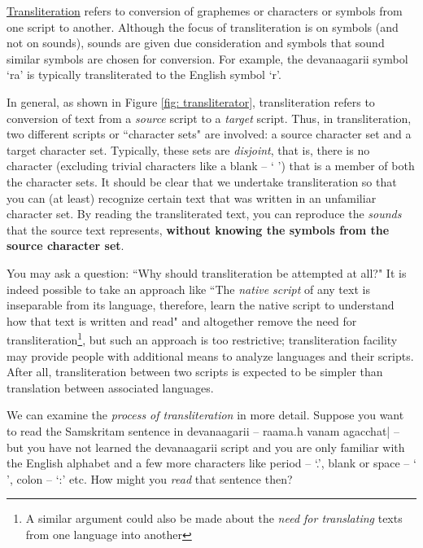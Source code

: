 \documentclass[a4paper, 12pt]{article}
\newcommand \sans[1]{
    \textsanskrit{#1}
}
\begin{document}
\href{https://en.m.wikipedia.org/wiki/Transliteration}{Transliteration} refers to conversion of graphemes or characters or symbols from one script to another. Although the focus of transliteration is on symbols (and not on sounds), sounds are given due consideration and symbols that sound similar symbols are chosen for conversion. For example, the \sans{devanaagarii} symbol \sans{`ra'} is typically transliterated to the English symbol `r'. 

In general, as shown in Figure \ref{fig: transliterator}, transliteration refers to conversion of text from a \emph{source} script to a \emph{target} script. Thus, in transliteration, two different scripts or ``character sets" are involved: a source character set and a target character set. Typically, these sets are \emph{disjoint}, that is, there is no character (excluding trivial characters like a blank -- ` ') that is a member of both the character sets. It should be clear that we undertake transliteration so that you can (at least) recognize certain text that was written in an unfamiliar character set. By reading the transliterated text, you can reproduce the \emph{sounds} that the source text represents, \textbf{without knowing the symbols from the source character set}. 

You may ask a question: ``Why should transliteration be attempted at all?" It is indeed possible to take an approach like ``The \emph{native script} of any text is inseparable from its language, therefore, learn the native script to understand how that text is written and read" and altogether remove the need for transliteration\footnote{A similar argument could also be made about the \emph{need for translating} texts from one language into another}, but such an approach is too restrictive; transliteration facility may provide people with additional means to analyze languages and their scripts. After all, transliteration between two scripts is expected to be simpler than translation between associated languages.

We can examine the \emph{process of transliteration} in more detail. Suppose you want to read the Samskritam sentence in \sans{devanaagarii} -- \sans{raama.h vanam agacchat|} -- but you have not learned the \sans{devanaagarii} script and you are only familiar with the English alphabet and a few more characters like period -- `.', blank or space -- ` ', colon -- `:' etc. How might you \emph{read} that sentence then? 
\end{document}
